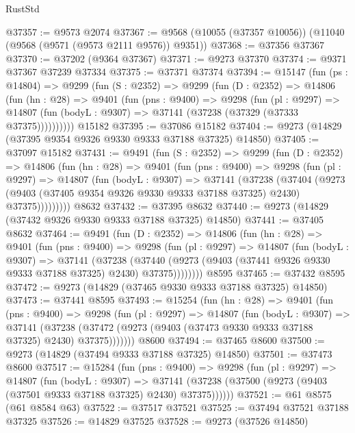 \begin{lexlean}{RustStd}
\begin{coremodule}
@37357 := @9573 @2074
@37367 := @9568 (@10055 (@37357 @10056)) (@11040 (@9568 (@9571 (@9573 @2111 @9576)) @9351))
@37368 := @37356 @37367
@37370 := @37202 (@9364 @37367)
@37371 := @9273 @37370
@37374 := @9371 @37367 @37239 @37334
@37375 := @37371 @37374
@37394 := @15147
    (fun (ps : @14804) =>
    @9299
      (fun (S : @2352) =>
      @9299
        (fun (D : @2352) =>
        @14806
          (fun (hn : @28) =>
          @9401
            (fun (pns : @9400) =>
            @9298
              (fun (pl : @9297) =>
              @14807 (fun (bodyL : @9307) => @37141 (@37238 (@37329 (@37333 @37375))))))))))
    @15182
@37395 := @37086 @15182
@37404 := @9273 (@14829 (@37395 @9354 @9326 @9330 @9333 @37188 @37325) @14850)
@37405 := @37097 @15182
@37431 := @9491
    (fun (S : @2352) =>
    @9299
      (fun (D : @2352) =>
      @14806
        (fun (hn : @28) =>
        @9401
          (fun (pns : @9400) =>
          @9298
            (fun (pl : @9297) =>
            @14807
              (fun (bodyL : @9307) =>
              @37141
                (@37238
                  (@37404
                    (@9273
                      (@9403 (@37405 @9354 @9326 @9330 @9333 @37188 @37325) @2430)
                      @37375)))))))))
    @8632
@37432 := @37395 @8632
@37440 := @9273 (@14829 (@37432 @9326 @9330 @9333 @37188 @37325) @14850)
@37441 := @37405 @8632
@37464 := @9491
    (fun (D : @2352) =>
    @14806
      (fun (hn : @28) =>
      @9401
        (fun (pns : @9400) =>
        @9298
          (fun (pl : @9297) =>
          @14807
            (fun (bodyL : @9307) =>
            @37141
              (@37238
                (@37440 (@9273 (@9403 (@37441 @9326 @9330 @9333 @37188 @37325) @2430) @37375))))))))
    @8595
@37465 := @37432 @8595
@37472 := @9273 (@14829 (@37465 @9330 @9333 @37188 @37325) @14850)
@37473 := @37441 @8595
@37493 := @15254
    (fun (hn : @28) =>
    @9401
      (fun (pns : @9400) =>
      @9298
        (fun (pl : @9297) =>
        @14807
          (fun (bodyL : @9307) =>
          @37141
            (@37238 (@37472 (@9273 (@9403 (@37473 @9330 @9333 @37188 @37325) @2430) @37375)))))))
    @8600
@37494 := @37465 @8600
@37500 := @9273 (@14829 (@37494 @9333 @37188 @37325) @14850)
@37501 := @37473 @8600
@37517 := @15284
    (fun (pns : @9400) =>
    @9298
      (fun (pl : @9297) =>
      @14807
        (fun (bodyL : @9307) =>
        @37141 (@37238 (@37500 (@9273 (@9403 (@37501 @9333 @37188 @37325) @2430) @37375))))))
@37521 := @61 @8575 (@61 @8584 @63)
@37522 := @37517 @37521
@37525 := @37494 @37521 @37188 @37325
@37526 := @14829 @37525
@37528 := @9273 (@37526 @14850)

\end{coremodule}
\end{lexlean}
